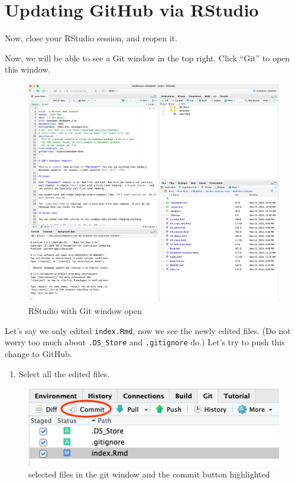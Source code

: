 \documentclass[
]{book}
\providecommand{\tightlist}{%
  \setlength{\itemsep}{0pt}\setlength{\parskip}{0pt}}
\theoremstyle{definition}
\theoremstyle{definition}
\theoremstyle{definition}
\theoremstyle{definition}
\theoremstyle{remark}
\begin{document}
\section{Updating GitHub via RStudio}\label{updating-github-via-rstudio}

Now, close your RStudio session, and reopen it.

Now, we will be able to see a Git window in the top right. Click ``Git'' to open this window.

\begin{figure}
\centering
\includegraphics{img/git-instruct/RStudio-with-git-window-open.png}
\caption{RStudio with Git window open}
\end{figure}

Let's say we only edited \texttt{index.Rmd}, now we see the newly edited files. (Do not worry too much about \texttt{.DS\_Store} and \texttt{.gitignore} do.) Let's try to push this change to GitHub.

\begin{enumerate}
\def\labelenumi{\arabic{enumi}.}
\setcounter{enumi}{12}
\tightlist
\item
  Select all the edited files.
\end{enumerate}

\begin{figure}
\centering
\includegraphics{img/git-instruct/git-window-selected-items.png}
\caption{selected files in the git window and the commit button highlighted}
\end{figure}
\end{document}
